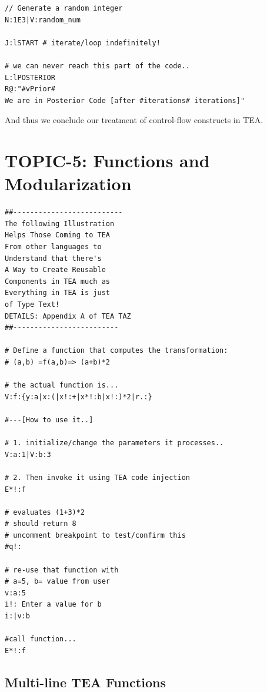 \documentclass[a4paper, 18pt]{book} %
\begin{document}
{{{\begin{appendices}
\begin{tcolorbox}[teaterminalstyle,]
\begin{lstlisting}[language=TEA,breaklines=true,]
// Generate a random integer
N:1E3|V:random_num

J:lSTART # iterate/loop indefinitely!

# we can never reach this part of the code..
L:lPOSTERIOR
R@:"#vPrior#
We are in Posterior Code [after #iterations# iterations]"
          \end{lstlisting}
         \end{tcolorbox}


And thus we conclude our treatment of control-flow constructs in TEA.



\section{TOPIC-5: Functions and Modularization}
\label{TEAFuncs}


\vspace{2em}
  \begin{tcolorbox}[teaterminalstyle, title=Basic TEA Functions, breakable]
  \begin{lstlisting}[language=TEA,breaklines=true,]
##--------------------------
The following Illustration
Helps Those Coming to TEA
From other languages to
Understand that there's
A Way to Create Reusable
Components in TEA much as
Everything in TEA is just
of Type Text!
DETAILS: Appendix A of TEA TAZ
##-------------------------

# Define a function that computes the transformation:
# (a,b) =f(a,b)=> (a+b)*2

# the actual function is...
V:f:{y:a|x:(|x!:+|x*!:b|x!:)*2|r.:}

#---[How to use it..]

# 1. initialize/change the parameters it processes..
V:a:1|V:b:3

# 2. Then invoke it using TEA code injection
E*!:f

# evaluates (1+3)*2
# should return 8
# uncomment breakpoint to test/confirm this
#q!:

# re-use that function with
# a=5, b= value from user
v:a:5
i!: Enter a value for b
i:|v:b

#call function... 
E*!:f
   \end{lstlisting}
  \end{tcolorbox}
\vspace{2em}


\subsection{Multi-line TEA Functions}
\label{SECTEAMultiFunc}




\end{appendices}}}}
\end{document}
